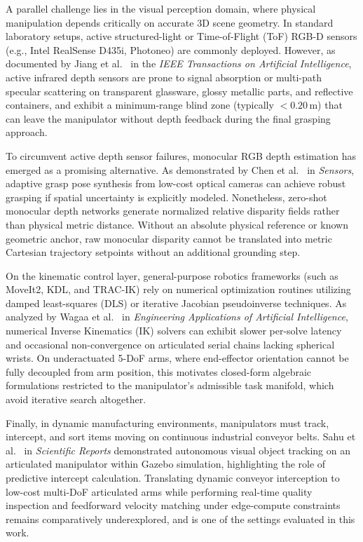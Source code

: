\documentclass[journal]{IEEEtran}
\begin{document}
A parallel challenge lies in the visual perception domain, where physical manipulation depends critically on accurate 3D scene geometry. In standard laboratory setups, active structured-light or Time-of-Flight (ToF) RGB-D sensors (e.g., Intel RealSense D435i, Photoneo) are commonly deployed. However, as documented by Jiang et al.~\cite{aria_113_jiang_2023_robotic} in the \textit{IEEE Transactions on Artificial Intelligence}, active infrared depth sensors are prone to signal absorption or multi-path specular scattering on transparent glassware, glossy metallic parts, and reflective containers, and exhibit a minimum-range blind zone (typically $<0.20$\,m) that can leave the manipulator without depth feedback during the final grasping approach.

To circumvent active depth sensor failures, monocular RGB depth estimation has emerged as a promising alternative. As demonstrated by Chen et al.~\cite{aria_116_authors_2025_adaptive} in \textit{Sensors}, adaptive grasp pose synthesis from low-cost optical cameras can achieve robust grasping if spatial uncertainty is explicitly modeled. Nonetheless, zero-shot monocular depth networks generate normalized relative disparity fields rather than physical metric distance. Without an absolute physical reference or known geometric anchor, raw monocular disparity cannot be translated into metric Cartesian trajectory setpoints without an additional grounding step.

On the kinematic control layer, general-purpose robotics frameworks (such as MoveIt2, KDL, and TRAC-IK) rely on numerical optimization routines utilizing damped least-squares (DLS) or iterative Jacobian pseudoinverse techniques. As analyzed by Wagaa et al.~\cite{aria_040_wagaa_2023_analytical} in \textit{Engineering Applications of Artificial Intelligence}, numerical Inverse Kinematics (IK) solvers can exhibit slower per-solve latency and occasional non-convergence on articulated serial chains lacking spherical wrists. On underactuated 5-DoF arms, where end-effector orientation cannot be fully decoupled from arm position, this motivates closed-form algebraic formulations restricted to the manipulator's admissible task manifold, which avoid iterative search altogether.

Finally, in dynamic manufacturing environments, manipulators must track, intercept, and sort items moving on continuous industrial conveyor belts. Sahu et al.~\cite{aria_010_sahu_2025_autonomous} in \textit{Scientific Reports} demonstrated autonomous visual object tracking on an articulated manipulator within Gazebo simulation, highlighting the role of predictive intercept calculation. Translating dynamic conveyor interception to low-cost multi-DoF articulated arms while performing real-time quality inspection and feedforward velocity matching under edge-compute constraints remains comparatively underexplored, and is one of the settings evaluated in this work.
\end{document}
